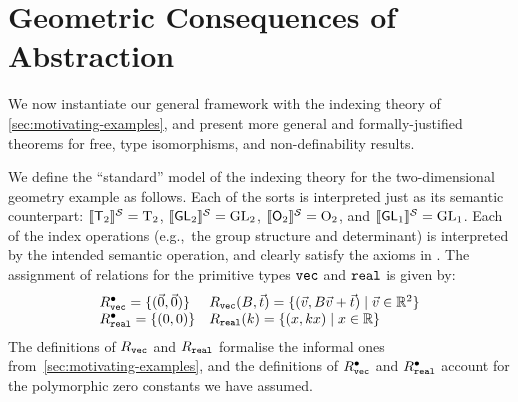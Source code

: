 \section{Geometric Consequences of Abstraction}
\label{sec:instantiations}
We now instantiate our general framework %
with
the indexing theory of \autoref{sec:motivating-examples}, and present
more general and formally-justified theorems for free, type
isomorphisms, and non-definability results.


We define the ``standard'' model of the indexing theory for the
two-dimensional geometry example as follows. Each of the sorts is
interpreted just as its semantic counterpart: $\llbracket \mathsf{T}_2 \rrbracket^{\mathcal{S}}
= \mathrm{T}_2$, $ \llbracket \mathsf{GL}_2 \rrbracket^{\mathcal{S}} = \mathrm{GL}_2$, $
\llbracket \mathsf{O}_2 \rrbracket^{\mathcal{S}} = \mathrm{O}_2$, and $ \llbracket \mathsf{GL}_1 \rrbracket^{\mathcal{S}} =
\mathrm{GL}_1$.
  Each of the index operations (e.g.,~the group structure and
  determinant) is interpreted by the intended semantic operation, and
  clearly satisfy the axioms in . The
  assignment of relations for the primitive types $\textup{\texttt{vec}}$ and
  $\textup{\texttt{real}}$ is given by: %
  \begin{displaymath}
    \begin{array}{ll}
      R^{\bullet}_{\textup{\texttt{vec}}} = \{( \vec{0}, \vec{0} ) \}&
      R_{\textup{\texttt{vec}}}(B,\vec{t}) = \{ (\vec{v}, B\vec{v} + \vec{t}) \mathrel| \vec{v} \in \mathbb{R}^2 \} \\
      R^{\bullet}_{\textup{\texttt{real}}} = \{(0,0)\} &
      R_{\textup{\texttt{real}}}(k) = \{ (x, kx) \mathrel| x \in \mathbb{R} \}
    \end{array}
  \end{displaymath}
  The definitions of $R_{\textup{\texttt{vec}}}$ and $R_{\textup{\texttt{real}}}$
formalise the informal ones from~\autoref{sec:motivating-examples}, and 
  the definitions of %
  $R^\bullet_{\textup{\texttt{vec}}}$ and $R^\bullet_{\textup{\texttt{real}}}$ 
  account for the
  polymorphic zero constants we have assumed.

